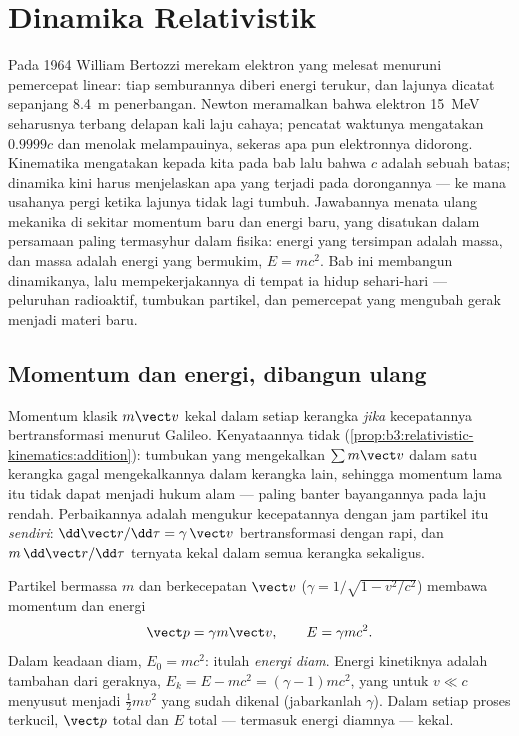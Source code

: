 \chapter{Dinamika Relativistik}\label{ch:b3:relativistic-dynamics}

Pada 1964 William Bertozzi merekam elektron yang melesat menuruni
pemercepat linear: tiap semburannya diberi energi terukur, dan lajunya
dicatat sepanjang \qty{8.4}{m} penerbangan. Newton meramalkan bahwa
elektron \qty{15}{MeV} seharusnya terbang delapan kali laju cahaya;
pencatat waktunya mengatakan $0.9999c$ dan menolak melampauinya,
sekeras apa pun elektronnya didorong. Kinematika mengatakan kepada kita
pada bab lalu bahwa $c$ adalah sebuah batas; dinamika kini harus
menjelaskan apa yang terjadi pada dorongannya --- ke mana usahanya pergi
ketika lajunya tidak lagi tumbuh. Jawabannya menata ulang mekanika di
sekitar momentum baru dan energi baru, yang disatukan dalam persamaan
paling termasyhur dalam fisika: energi yang tersimpan adalah massa, dan
massa adalah energi yang bermukim, $E = mc^2$. Bab ini membangun
dinamikanya, lalu mempekerjakannya di tempat ia hidup sehari-hari ---
peluruhan radioaktif, tumbukan partikel, dan pemercepat yang mengubah
gerak menjadi materi baru.

\section{Momentum dan energi, dibangun ulang}

\begin{remark}\label{rem:b3:relativistic-dynamics:why}
Momentum klasik $m\vect v$ kekal dalam setiap kerangka \emph{jika}
kecepatannya bertransformasi menurut Galileo. Kenyataannya tidak
(\cref{prop:b3:relativistic-kinematics:addition}): tumbukan yang
mengekalkan $\sum m\vect v$ dalam satu kerangka gagal mengekalkannya
dalam kerangka lain, sehingga momentum lama itu tidak dapat menjadi
hukum alam --- paling banter bayangannya pada laju rendah.
Perbaikannya adalah mengukur kecepatannya dengan jam partikel itu
\emph{sendiri}: $\dd\vect r/\dd\tau =
\gamma\,\vect v$ bertransformasi dengan rapi, dan $m\,\dd\vect r/\dd\tau$
ternyata kekal dalam semua kerangka sekaligus.
\end{remark}

\begin{definition}\label{def:b3:relativistic-dynamics:momentum-energy}
Partikel bermassa $m$ dan berkecepatan $\vect v$ ($\gamma = 1/\sqrt{1 -
v^2/c^2}$) membawa momentum dan energi
\[
\vect p = \gamma m\vect v , \qquad
E = \gamma mc^2 .
\]
Dalam keadaan diam, $E_0 = mc^2$: itulah \emph{energi diam}. Energi
kinetiknya adalah tambahan dari geraknya, $E_k = E - mc^2 = (\gamma - 1)mc^2$,
yang untuk $v
\ll c$ menyusut menjadi $\tfrac12 mv^2$ yang sudah dikenal (jabarkanlah
$\gamma$). Dalam setiap proses terkucil, $\vect p$ total dan $E$ total
--- termasuk energi diamnya --- kekal.
\end{definition}

